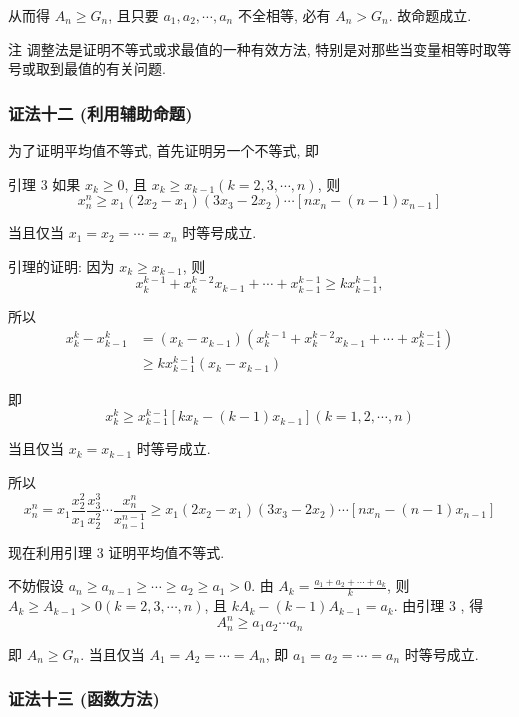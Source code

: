 从而得 $A_{n} \geqslant G_{n}$, 且只要 $a_{1}, a_{2}, \cdots, a_{n}$ 不全相等, 必有 $A_{n}>G_{n}$. 故命题成立.

注 调整法是证明不等式或求最值的一种有效方法, 特别是对那些当变量相等时取等号或取到最值的有关问题.

\subsubsection*{证法十二 (利用辅助命题)}

为了证明平均值不等式, 首先证明另一个不等式, 即

引理 3 如果 $x_{k} \geqslant 0$, 且 $x_{k} \geqslant x_{k-1}(k=2,3, \cdots, n)$, 则
$$
x_{n}^{n} \geqslant x_{1}\left(2 x_{2}-x_{1}\right)\left(3 x_{3}-2 x_{2}\right) \cdots\left[n x_{n}-(n-1) x_{n-1}\right]
$$

当且仅当 $x_{1}=x_{2}=\cdots=x_{n}$ 时等号成立.

引理的证明: 因为 $x_{k} \geqslant x_{k-1}$, 则
$$
x_{k}^{k-1}+x_{k}^{k-2} x_{k-1}+\cdots+x_{k-1}^{k-1} \geqslant k x_{k-1}^{k-1},
$$

所以
$$
\begin{aligned}
x_{k}^{k}-x_{k-1}^{k} & =\left(x_{k}-x_{k-1}\right)\left(x_{k}^{k-1}+x_{k}^{k-2} x_{k-1}+\cdots+x_{k-1}^{k-1}\right) \\
& \geqslant k x_{k-1}^{k-1}\left(x_{k}-x_{k-1}\right)
\end{aligned}
$$

即
$$
x_{k}^{k} \geqslant x_{k-1}^{k-1}\left[k x_{k}-(k-1) x_{k-1}\right](k=1,2, \cdots, n)
$$

当且仅当 $x_{k}=x_{k-1}$ 时等号成立.

所以
$$
x_{n}^{n}=x_{1} \frac{x_{2}^{2}}{x_{1}} \frac{x_{3}^{3}}{x_{2}^{2}} \cdots \frac{x_{n}^{n}}{x_{n-1}^{n-1}} \geqslant x_{1}\left(2 x_{2}-x_{1}\right)\left(3 x_{3}-2 x_{2}\right) \cdots\left[n x_{n}-(n-1) x_{n-1}\right]
$$

现在利用引理 3 证明平均值不等式.

不妨假设 $a_{n} \geqslant a_{n-1} \geqslant \cdots \geqslant a_{2} \geqslant a_{1}>0$. 由 $A_{k}=\frac{a_{1}+a_{2}+\cdots+a_{k}}{k}$, 则 $A_{k} \geqslant A_{k-1}>0(k=2,3, \cdots, n)$, 且 $k A_{k}-(k-1) A_{k-1}=a_{k}$. 由引理 3 , 得
$$
A_{n}^{n} \geqslant a_{1} a_{2} \cdots a_{n}
$$

即 $A_{n} \geqslant G_{n}$. 当且仅当 $A_{1}=A_{2}=\cdots=A_{n}$, 即 $a_{1}=a_{2}=\cdots=a_{n}$ 时等号成立.

\subsubsection*{证法十三 (函数方法)}

